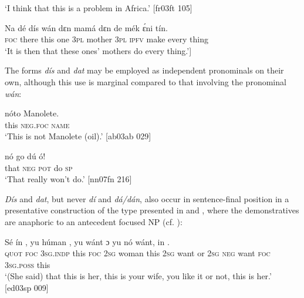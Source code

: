 \glt ‘I think that this is a problem in Africa.’ [fr03ft 105]
\z


\ea%
    \label{ex:key:195}
    \gll Na  dé    dís  wán    dɛn  mamá  dɛn  de  mék    ɛ́ni    tín.\\
\textsc{foc}  there  this  one    \textsc{3pl}  mother  \textsc{3pl}  \textsc{ipfv}  make  every  thing\\

\glt ‘It is then that these ones’ mothers do every thing.’\textstylePichiglossZchn{ [ab03ay 047}]
\z

The forms \textit{dís} and \textit{dat} may be employed as independent pronominals on their own, although this use is marginal compared to that involving the pronominal \textit{wán}:


\ea%
    \label{ex:key:196}
    \gll {}  nóto  Manolete.\\
this  \textsc{neg}.\textsc{foc}  \textsc{name}\\
\glt ‘This is not Manolete (oil).’ [ab03ab 029]\\
\z

\ea%
    \label{ex:key:197}
    \gll {} nó  go  dú  ó!\\
that  \textsc{neg}  \textsc{pot}  do  \textsc{sp}\\

\glt ‘That really won’t do.’ [nn07fn 216]
\z

\textit{Dís} and \textit{dat}, but never \textit{dí} and \textit{dá}\textit{\textup{/}}\textit{dán}, also occur in sentence-final position in a presentative construction of the type presented in  and , where the demonstratives are anaphoric to an antecedent focused \textsc{NP} (cf. )\textsc{:} 


\ea%
    \label{ex:key:198}
    \gll Sé     ín    ,   yu  húman  ,  yu  wánt
ɔ  yu  nó  wánt,   in    . \\
\textsc{quot}    \textsc{foc}  \textsc{3sg.indp}  this  \textsc{foc}  \textsc{2sg}  woman  this  \textsc{2sg}  want
or  \textsc{2sg}  \textsc{neg}  want  \textsc{foc}  \textsc{3sg.poss}  this \\

\glt ‘(She said) that this is her, this is your wife, you like it or not, 
this is her.’ [ed03sp 009]
\z


